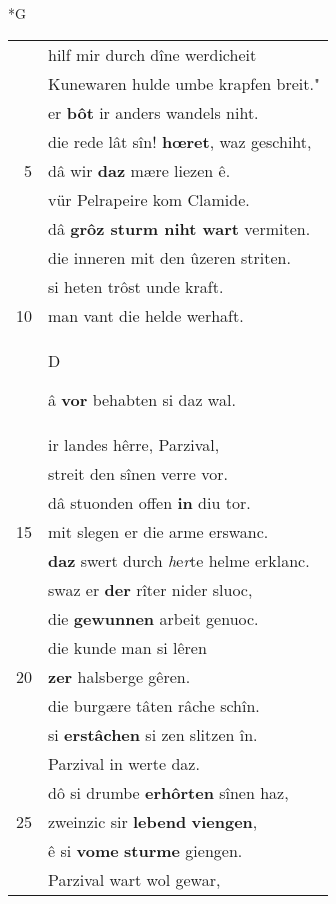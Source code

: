 \documentclass[8pt,a4paper,notitlepage]{article}
\begin{document}
\begin{table}[ht]
\begin{minipage}[t]{0.5\linewidth}
\small
\begin{center}*G
\end{center}
\begin{tabular}{rl}
 & hilf mir durch dîne werdicheit\\ 
 & Kunewaren hulde umbe krapfen breit."\\ 
 & er \textbf{bôt} ir anders wandels niht.\\ 
 & die rede lât sîn! \textbf{hœret}, waz geschiht,\\ 
5 & dâ wir \textbf{daz} mære liezen ê.\\ 
 & vür Pelrapeire kom Clamide.\\ 
 & dâ \textbf{grôz sturm niht wart} vermiten.\\ 
 & die inneren mit den ûzeren striten.\\ 
 & si heten trôst unde kraft.\\ 
10 & man vant die helde werhaft.\\ 
 & \begin{large}D\end{large}â \textbf{vor} behabten si daz wal.\\ 
 & ir landes hêrre, Parzival,\\ 
 & streit den sînen verre vor.\\ 
 & dâ stuonden offen \textbf{in} diu tor.\\ 
15 & mit slegen er die arme erswanc.\\ 
 & \textbf{daz} swert durch \textit{h}e\textit{r}te helme erklanc.\\ 
 & swaz er \textbf{der} rîter nider sluoc,\\ 
 & die \textbf{gewunnen} arbeit genuoc.\\ 
 & die kunde man si lêren\\ 
20 & \textbf{zer} halsberge gêren.\\ 
 & die burgære tâten râche schîn.\\ 
 & si \textbf{erstâchen} si zen slitzen în.\\ 
 & Parzival in werte daz.\\ 
 & dô si drumbe \textbf{erhôrten} sînen haz,\\ 
25 & zweinzic sir \textbf{lebend} \textbf{viengen},\\ 
 & ê si \textbf{vome} \textbf{sturme} giengen.\\ 
 & Parzival wart wol gewar,\\ 

\end{tabular}
\end{minipage}
\end{table}
\end{document}
